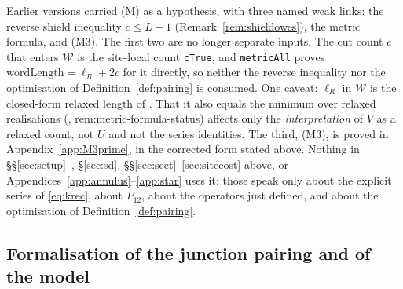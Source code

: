 \documentclass[11pt]{article}
\theoremstyle{plain}
\theoremstyle{definition}
\theoremstyle{remark}
\begin{document}
\noindent Earlier versions carried \textup{(M)} as a hypothesis, with three named weak links: the
reverse shield inequality $c\le L-1$ (Remark~\ref{rem:shieldowes}), the metric formula, and
\textup{(M3)}. The first two are no longer separate inputs. The cut count $c$ that enters
$\mathcal W$ is the site-local count \texttt{cTrue}, and \texttt{metricAll} proves
$\mathrm{wordLength}=\ell_R+2c$ for it directly, so neither the reverse inequality nor the
optimisation of Definition~\ref{def:pairing} is consumed. One caveat: $\ell_R$ in $\mathcal W$ is the
closed-form relaxed length of \cite{Bonfioli2026a}. That it also equals the minimum over relaxed
realisations (\cite{Bonfioli2026a}, \textup{rem:metric-formula-status}) affects only the
\emph{interpretation} of $V$ as a relaxed count, not $U$ and not the series identities. The third,
\textup{(M3)}, is proved in Appendix~\ref{app:M3prime}, in the corrected form stated above. Nothing in \S\S\ref{sec:setup}--{\cite[\textup{sec:numerators}]{Bonfioli2026bA}}, \S\ref{sec:sd},
\S\S\ref{sec:sect}--\ref{sec:sitecost} above, or Appendices~\ref{app:annulus}--\ref{app:star} uses
it: those speak only about the explicit series of \eqref{eq:krec}, about $P_{12}$, about the
operators just defined, and about the optimisation of Definition~\ref{def:pairing}.

\subsection{Formalisation of the junction pairing and of the model}\label{sec:RJlean}
\end{document}
